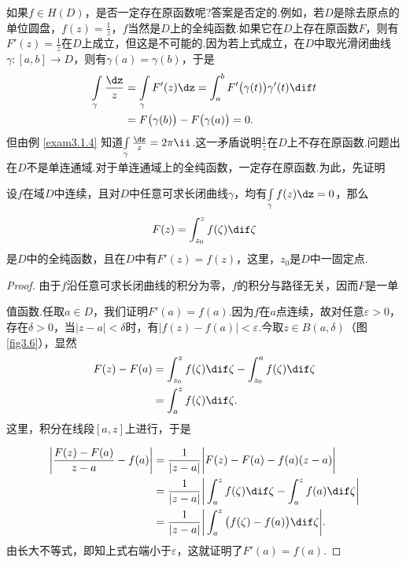 如果$f\in H(D)$，是否一定存在原函数呢?答案是否定的.例如，若$D$是除去原点的单位圆盘，$f(z)=\frac1z$，$f$当然是$D$上的全纯函数.如果它在$D$上存在原函数$F$，则有$F'(z)=\frac1z$在$D$上成立，但这是不可能的.因为若上式成立，在$D$中取光滑闭曲线$\gamma:[a,b]\to D$，则有$\gamma(a)=\gamma(b)$，于是
\begin{align*}
\int\limits_\gamma\frac{\dz}z&=\int\limits_\gamma F'(z)\dz
=\int_a^bF'\big(\gamma(t)\big)\gamma'(t)\dif t\\
&=F\big(\gamma(b)\big)-F\big(\gamma(a)\big)=0.
\end{align*}
但由例 \ref{exam3.1.4} 知道$\int\limits_\gamma\frac{\dz}z=2\pi\ii$.这一矛盾说明$\frac1z$在$D$上不存在原函数.问题出在$D$不是单连通域.对于单连通域上的全纯函数，一定存在原函数.为此，先证明
\begin{theorem}\label{thm3.3.2}
设$f$在域$D$中连续，且对$D$中任意可求长闭曲线$\gamma$，均有$\int\limits_\gamma f(z)\dz=0$，那么
\[F(z)=\int_{z_0}^zf(\zeta)\dif \zeta\]
是$D$中的全纯函数，且在$D$中有$F'(z)=f(z)$，这里，$z_0$是$D$中一固定点.
\end{theorem}
\begin{proof}
由于$f$沿任意可求长闭曲线的积分为零，$f$的积分与路径无关，因而$F$是一单\\[1mm]
\begin{minipage}[b]{0,7\textwidth}
值函数.任取$a\in D$，我们证明$F'(a)=f(a)$.因为$f$在$a$点连续，故对任意$\varepsilon>0$，存在$\delta>0$，当$|z-a|<\delta$时，有$|f(z)-f(a)|<\varepsilon$.今取$z\in B(a,\delta)$（图 \ref{fig3.6}），显然
\begin{align*}
F(z)-F(a)&=\int_{z_0}^zf(\zeta)\dif \zeta-\int_{z_0}^af(\zeta)\dif \zeta\\
&=\int_a^zf(\zeta)\dif \zeta.
\end{align*}
这里，积分在线段$[a,z]$上进行，于是
\end{minipage}
\begin{minipage}[b]{0.3\textwidth}
\centering
{}
\end{minipage}
\begin{align*}
\bigg|\frac{F(z)-F(a)}{z-a}-f(a)\bigg|
&=\frac1{|z-a|}\bigg|F(z)-F(a)-f(a)(z-a)\bigg|\\
&=\frac1{|z-a|}\bigg|\int_a^zf(\zeta)\dif \zeta-\int_a^zf(a)\dif \zeta\bigg|\\
&=\frac1{|z-a|}\bigg|\int_a^z\big(f(\zeta)-f(a)\big)\dif \zeta\bigg|.
\end{align*}
由长大不等式，即知上式右端小于$\varepsilon$，这就证明了$F'(a)=f(a)$.
\end{proof}

